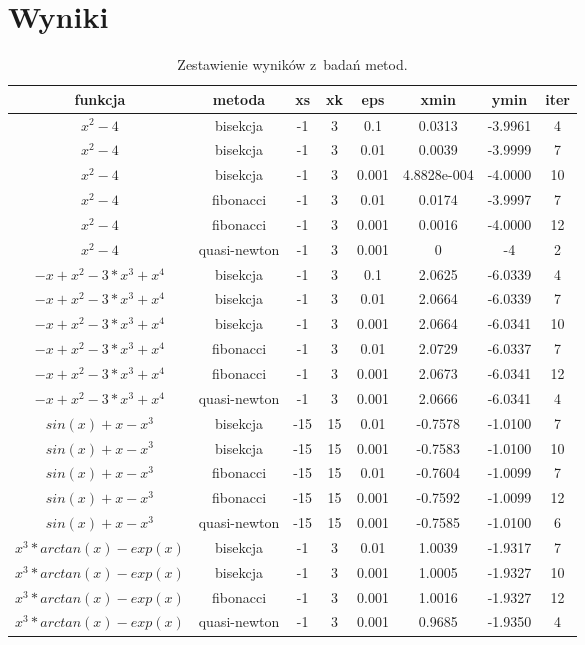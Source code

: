 \documentclass{classrep}
\begin{document}
\section{Wyniki}
	\begin{table}[H]
		\begin{center}
\begin{tabular}{|c|c|c|c|c|c|c|c|}

\hline funkcja & metoda & xs & xk & eps & xmin & ymin & iter \\
\hline $x^2 - 4$ & bisekcja & -1 & 3 & 0.1 & 0.0313 & -3.9961 & 4\\
\hline $x^2 - 4$ & bisekcja & -1 & 3 & 0.01 & 0.0039 & -3.9999 & 7\\
\hline $x^2 - 4$ & bisekcja & -1 & 3 & 0.001 & 4.8828e-004 & -4.0000 & 10 \\
\hline $x^2 - 4$ & fibonacci & -1 & 3 & 0.01 & 0.0174 & -3.9997 & 7\\
\hline $x^2 - 4$ & fibonacci & -1 & 3 & 0.001 & 0.0016 & -4.0000 & 12 \\
\hline $x^2 - 4$ & quasi-newton & -1 & 3 & 0.001 & 0 & -4 & 2\\
\hline $-x + x^2 - 3*x^3 + x^4$ & bisekcja & -1 & 3 & 0.1 & 2.0625 & -6.0339 & 4 \\
\hline $-x + x^2 - 3*x^3 + x^4$ & bisekcja & -1 & 3 & 0.01 & 2.0664 & -6.0339 & 7 \\
\hline $-x + x^2 - 3*x^3 + x^4$ & bisekcja & -1 & 3 & 0.001 & 2.0664 & -6.0341 &10 \\
\hline $-x + x^2 - 3*x^3 + x^4$ & fibonacci & -1 & 3 & 0.01 & 2.0729 & -6.0337 & 7 \\
\hline $-x + x^2 - 3*x^3 + x^4$ & fibonacci & -1 & 3 & 0.001 & 2.0673 & -6.0341 & 12 \\
\hline $-x + x^2 - 3*x^3 + x^4$ & quasi-newton & -1 & 3 & 0.001 & 2.0666 & -6.0341 & 4\\
\hline $sin(x)+x-x^3$ & bisekcja & -15 & 15 & 0.01 & -0.7578 & -1.0100 & 7\\
\hline $sin(x)+x-x^3$ & bisekcja & -15 & 15 & 0.001 & -0.7583 & -1.0100 & 10\\
\hline $sin(x)+x-x^3$ & fibonacci & -15 & 15 & 0.01 & -0.7604 & -1.0099 & 7 \\
\hline $sin(x)+x-x^3$ & fibonacci & -15 & 15 & 0.001 & -0.7592 & -1.0099 & 12\\
\hline $sin(x)+x-x^3$ & quasi-newton & -15 & 15 & 0.001 & -0.7585 & -1.0100 & 6 \\
\hline $x^3*arctan(x)-exp(x)$ & bisekcja & -1 & 3 & 0.01 & 1.0039 & -1.9317 & 7 \\
\hline $x^3*arctan(x)-exp(x)$ & bisekcja & -1 & 3 & 0.001 & 1.0005 & -1.9327 & 10\\
\hline $x^3*arctan(x)-exp(x)$ & fibonacci & -1 & 3 & 0.001 & 1.0016 & -1.9327  & 12\\
\hline $x^3*arctan(x)-exp(x)$ & quasi-newton & -1 & 3 & 0.001 & 0.9685 & -1.9350 & 4 \\
\hline
\end{tabular} 
				\caption{Zestawienie wyników z~badań metod.}
		\end{center}
	\end{table}
	
\end{document}
